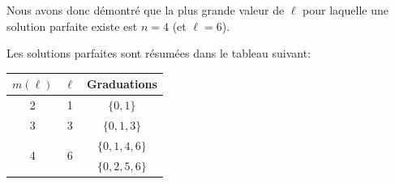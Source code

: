 \medskip

Nous avons donc démontré que la plus grande valeur de \( \ell \) pour laquelle une solution parfaite existe est \( n = 4 \) (et \( \ell = 6 \)).

\medskip

Les solutions parfaites sont résumées dans le tableau suivant:

\begin{center}
\begin{tabular}{|c|c|c|}
\hline
\( m(\ell) \) & \( \ell \) & Graduations \\
\hline
2 & 1 & \( \{0, 1\} \) \\
\hline
3 & 3 & \( \{0, 1, 3\} \) \\
\hline
\multirow{2}{*}{4} & \multirow{2}{*}{6} & \( \{0, 1, 4, 6\} \) \\
& & \( \{0, 2, 5, 6\} \) \\
\hline
\end{tabular}
\end{center}